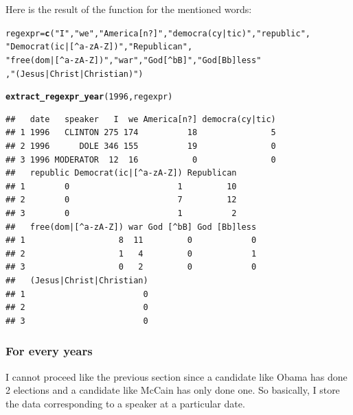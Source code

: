 \documentclass{llncs}\usepackage[]{graphicx}\usepackage[]{color}
\makeatletter
\newcommand{\hlnum}[1]{\textcolor[rgb]{0.686,0.059,0.569}{#1}}%
\newcommand{\hlstr}[1]{\textcolor[rgb]{0.192,0.494,0.8}{#1}}%
\newcommand{\hlstd}[1]{\textcolor[rgb]{0.345,0.345,0.345}{#1}}%
\newcommand{\hlkwb}[1]{\textcolor[rgb]{0.69,0.353,0.396}{#1}}%
\newcommand{\hlkwd}[1]{\textcolor[rgb]{0.737,0.353,0.396}{\textbf{#1}}}%
\newenvironment{kframe}{%
 \def\at@end@of@kframe{}%
 \ifinner\ifhmode%
  \def\at@end@of@kframe{\end{minipage}}%
  \begin{minipage}{\columnwidth}%
 \fi\fi%
 \def\FrameCommand##1{\hskip\@totalleftmargin \hskip-\fboxsep
 \colorbox{shadecolor}{##1}\hskip-\fboxsep
     \hskip-\linewidth \hskip-\@totalleftmargin \hskip\columnwidth}%
 \MakeFramed {\advance\hsize-\width
   \@totalleftmargin\z@ \linewidth\hsize
   \@setminipage}}%
 {\par\unskip\endMakeFramed%
 \at@end@of@kframe}
\newenvironment{knitrout}{}{} %
\makeatother
\begin{document}
Here is the result of the function for the mentioned words:
\begin{knitrout}
\color{fgcolor}\begin{kframe}
\begin{alltt}
\hlstd{regexpr}\hlkwb{=}\hlkwd{c}\hlstd{(}\hlstr{"I"}\hlstd{,}\hlstr{"we"}\hlstd{,}\hlstr{"America[n?]"}\hlstd{,}\hlstr{"democra(cy|tic)"}\hlstd{,}\hlstr{"republic"}\hlstd{,}
          \hlstr{"Democrat(ic|[^a-zA-Z])"}\hlstd{,}\hlstr{"Republican"}\hlstd{,}
          \hlstr{"free(dom|[^a-zA-Z])"}\hlstd{,}\hlstr{"war"}\hlstd{,}\hlstr{"God [^bB]"}\hlstd{,}\hlstr{"God [Bb]less"}
          \hlstd{,}\hlstr{"(Jesus|Christ|Christian)"}\hlstd{)}

\hlkwd{extract_regexpr_year}\hlstd{(}\hlnum{1996}\hlstd{,regexpr)}
\end{alltt}
\begin{lstlisting}[basicstyle=\ttfamily,breaklines=true]
##   date   speaker   I  we America[n?] democra(cy|tic)
## 1 1996   CLINTON 275 174          18               5
## 2 1996      DOLE 346 155          19               0
## 3 1996 MODERATOR  12  16           0               0
##   republic Democrat(ic|[^a-zA-Z]) Republican
## 1        0                      1         10
## 2        0                      7         12
## 3        0                      1          2
##   free(dom|[^a-zA-Z]) war God [^bB] God [Bb]less
## 1                   8  11         0            0
## 2                   1   4         0            1
## 3                   0   2         0            0
##   (Jesus|Christ|Christian)
## 1                        0
## 2                        0
## 3                        0
\end{lstlisting}
\end{kframe}
\end{knitrout}

\subsubsection{For every years}
I cannot proceed like the previous section since a candidate like Obama has done 2 elections and a candidate like McCain has only done one. So basically, I store the data corresponding to a speaker at a particular date.
\end{document}
